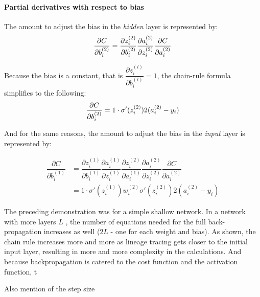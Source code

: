 
\hypertarget{partial-derivatives-with-respect-to-bias}{%
\paragraph{Partial derivatives with respect to
bias}\label{partial-derivatives-with-respect-to-bias}}

The amount to adjust the bias in the \emph{hidden} layer is
represented by: \[
\frac{\partial{C}}{\partial{b_i^{(2)}}}  =  \dfrac{\partial{z_i^{(2)}}}{\partial{b_i^{(2)}}}
     \dfrac{\partial{a_i^{(2)}}}{\partial{z_i^{(2)}}}
     \dfrac{\partial{C}}{\partial{a_i^{(2)}}} \\
\]

Because the bias is a constant, that is
\(\dfrac{\partial{z_i^{(l)}}}{\partial{b_i^{(l)}}} = 1\), the chain-rule
formula simplifies to the following: \[
\frac{\partial{C}}{\partial{b_i^{(2)}}} = 1 \cdot \sigma'(z_i^{(2)}) 2(a_i^{(2)}-y_i) \\
\]

And for the same reasons, the amount to adjust the bias in the \emph{input} layer is
represented by:

    \begin{align*}
\dfrac{\partial{C}}{\partial{b_i^{(1)}}} 
& = \dfrac{\partial{z_i^{(1)}}}{\partial{b_i^{(1)}}} \dfrac{\partial{a_i^{(1)}}}{\partial{z_i^{(1)}}}  \dfrac{\partial{z_i^{(2)}}}{\partial{a_i^{(1)}}}
     \dfrac{\partial{a_i^{(2)}}}{\partial{z_i^{(2)}}}
     \dfrac{\partial{C}}{\partial{a_i^{(2)}}} \\ \nonumber
& = 1 \cdot \sigma'(z_i^{(1)}) w_i^{(2)} \sigma'(z_i^{(2)}) 2(a_i^{(2)}-y_i) \nonumber
    \end{align*}


The preceding demonstration was for a simple shallow network.  In a network with more layers $L$ , the number of equations needed for the full back-propagation increases as well ($2L$ - one for each weight and bias).  As shown, the chain rule increases more and more as lineage tracing gets closer to the initial input layer, resulting in more and more complexity in the calculations.  And because backpropagation is catered to the cost function and the activation function, t

Also mention of the step size